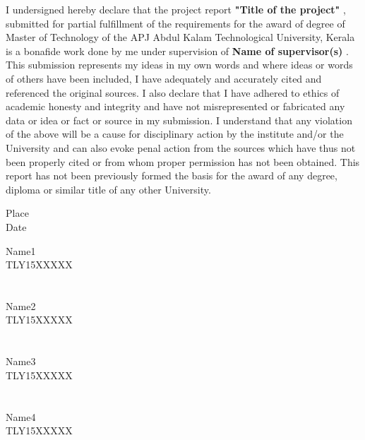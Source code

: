 \documentclass[BTech]{cetlyproj}
\begin{document}
I undersigned hereby declare that the project report {\bf "Title of the project" }, submitted for partial fulfillment of the requirements for the award of degree of Master of Technology of the APJ Abdul Kalam Technological University, Kerala is a bonafide work done by me under supervision of {\bf Name of supervisor(s)} . This submission represents my ideas in my own words and where ideas or words of others have been included, I have adequately and accurately cited and referenced the original sources. I also declare that I have adhered to ethics of academic honesty and integrity and have not misrepresented or fabricated any data or idea or fact or source in my submission. I understand that any
violation of the above will be a cause for disciplinary action by the institute and/or the University and can also evoke penal action from the sources which have thus not been properly cited or from whom proper permission has not been obtained. This report has not been previously formed the basis for the award of any degree, diploma or similar title
of any other University.\par
\vspace*{0.2in}
\begin{singlespacing}
	\hspace*{-0.25in}
	\parbox{2.5in}{
		\vspace{3.2in}
		\noindent Place \\
		\noindent Date \\
	} 
	\hspace*{1.0in}
	\parbox{2.5in}{
		\noindent
		\noindent Name1\\
		\noindent TLY15XXXXX
		\\
		\\ \\
		\noindent
		\noindent Name2\\
		\noindent TLY15XXXXX
		\\
		\\ \\
		\noindent
		\noindent Name3\\
		\noindent TLY15XXXXX
		\\
		\\ \\
		\noindent
		\noindent Name4\\
		\noindent TLY15XXXXX
	}  
\end{singlespacing}
\certificate

\vspace*{0.25in}
\end{document}
